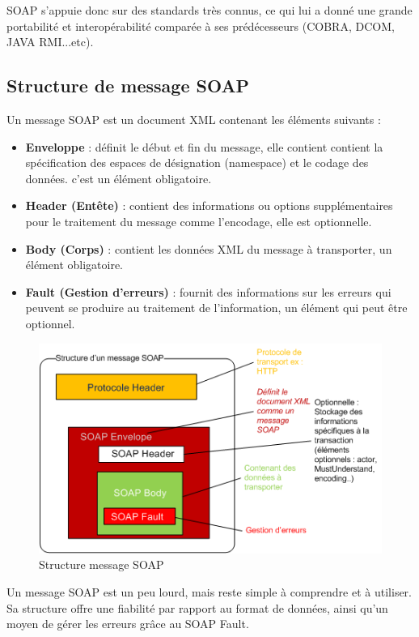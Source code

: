 SOAP s'appuie donc sur des standards très connus, ce qui lui a donné une grande portabilité et interopérabilité comparée à ses prédécesseurs (COBRA, DCOM, JAVA RMI...etc).
				
\subsection{Structure de message SOAP}
Un message SOAP est un document XML contenant les éléments suivants : \cite{refTutorialPointsSOAP}
\begin{itemize}
	\item \textbf{Enveloppe} : définit le début et fin du message, elle contient contient la spécification des espaces de désignation (namespace) et le codage des données. c'est un élément obligatoire.
	\item \textbf{Header (Entête)} : contient des informations ou options supplémentaires pour le traitement du message comme l'encodage, elle est optionnelle.
	\item \textbf{Body (Corps)} : contient les données XML du message à transporter, un élément obligatoire.
	\item \textbf{Fault (Gestion d'erreurs)} : fournit des informations sur les erreurs qui peuvent se produire au traitement de l'information, un élément qui peut être optionnel.
\end{itemize}
\begin{figure}[h]
	\begin{center}
		\includegraphics[scale=1]{img/soapmessagebody.png}
	\end{center}	
	\label{Structure message SOAP}
	\caption{Structure message SOAP}		
	\centering
\end{figure}			
Un message SOAP est un peu lourd, mais reste simple à comprendre et à utiliser. Sa structure offre une fiabilité par rapport au format de données, ainsi qu'un moyen de gérer les erreurs grâce au SOAP Fault.
\newpage
